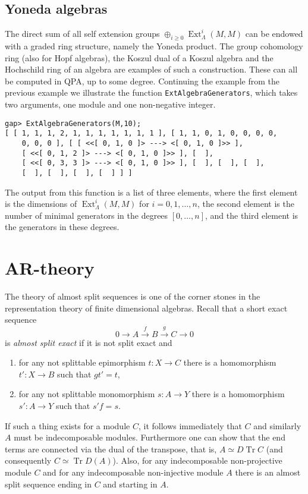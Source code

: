 \documentclass{amsart}
\newcommand{\Tr}{\operatorname{Tr}\nolimits}
\newcommand{\Ext}{\operatorname{Ext}\nolimits}
\theoremstyle{definition}
\newcommand{\code}[1]{\texttt{#1}}
\theoremstyle{theoretic}
\begin{document}
\subsection{Yoneda algebras}
The direct sum of all self extension groups $\oplus_{i\geqslant 0}
\Ext^i_\Lambda(M,M)$ can be endowed with a graded ring structure,
namely the Yoneda product.  The group cohomology ring (also for Hopf
algebras), the Koszul dual of a Koszul algebra and the Hochschild ring
of an algebra are examples of such a construction.  These can all be
computed in QPA, up to some degree.  Continuing the example from the
previous example we illustrate the function
\code{ExtAlgebraGenerators}, which takes two arguments, one module and
one non-negative integer.  
\begin{verbatim}
gap> ExtAlgebraGenerators(M,10);
[ [ 1, 1, 1, 2, 1, 1, 1, 1, 1, 1, 1 ], [ 1, 1, 0, 1, 0, 0, 0, 0, 
    0, 0, 0 ], [ [ <<[ 0, 1, 0 ]> ---> <[ 0, 1, 0 ]>> ], 
    [ <<[ 0, 1, 2 ]> ---> <[ 0, 1, 0 ]>> ], [  ], 
    [ <<[ 0, 3, 3 ]> ---> <[ 0, 1, 0 ]>> ], [  ], [  ], [  ], 
    [  ], [  ], [  ], [  ] ] ]
\end{verbatim}
The output from this function is a list of three elements, where the
first element is the dimensions of $\Ext^i_\Lambda(M,M)$ for
$i=0,1,\ldots,n$, the second element is the number of minimal
generators in the degrees $[0,\ldots,n]$, and the third element is the
generators in these degrees.

\section{AR-theory}
The theory of almost split sequences is one of the corner stones in
the representation theory of finite dimensional algebras.  Recall that
a short exact sequence 
\[0\to A\xrightarrow{f} B\xrightarrow{g} C\to 0\]
is \emph{almost split exact} if it is not split exact and 
\begin{enumerate}[\rm(i)]
\item for any not splittable epimorphism $t\colon X\to C$ there is a
  homomorphism $t'\colon X\to B$ such that $gt' = t$, 
\item for any not splittable monomorphism $s\colon A\to Y$ there is a
  homomorphism $s'\colon A\to Y$ such that $s'f = s$.
\end{enumerate}
If such a thing exists for a module $C$, it follows immediately that
$C$ and similarly $A$ must be indecomposable modules.  Furthermore one
can show that the end terms are connected via the dual of the
transpose, that is, $A\simeq D\Tr C$ (and consequently $C\simeq \Tr
D(A)$).  Also, for any indecomposable non-projective module $C$ and
for any indecomposable non-injective module $A$ there is an almost
split sequence ending in $C$ and starting in $A$.  
\end{document}
